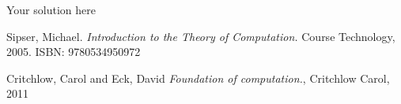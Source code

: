 \documentclass[12pt]{article}
\newenvironment{solution}[1][{\color{red} Solution:}]{\begin{trivlist}
\item[\hskip \labelsep {\bfseries #1}\hskip \labelsep {\bfseries}]}{\end{trivlist}}
\begin{document}
\begin{solution}
Your solution here
\end{solution}


\vfill
\begin{thebibliography}{9}
Sipser, Michael. 
\textit{Introduction to the Theory of Computation.}
Course Technology, 2005. ISBN: 9780534950972

Critchlow, Carol and Eck, David
\textit{Foundation of computation.},
Critchlow Carol, 2011

\end{thebibliography}

 
\end{document}
